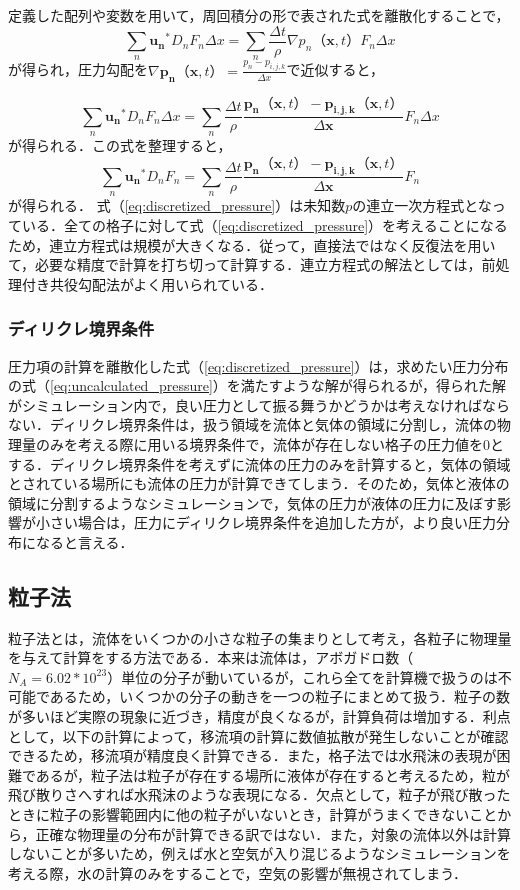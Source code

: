 \documentclass[a4j,12pt]{jreport}
\begin{document}
定義した配列や変数を用いて，周回積分の形で表された式を離散化することで，
$$ \sum_{n}\bm{u_n}^*D_nF_n\varDelta x = \sum_{n}\frac{\varDelta t}{\rho}\nabla p_n（\bm{x},t）F_n\varDelta x $$
が得られ，圧力勾配を$\nabla \bm{p_n}（\bm{x},t） = \frac{p_n - p_{i,j,k}}{\varDelta x}$で近似すると，

$$ \sum_{n}\bm{u_n}^*D_nF_n\varDelta x = \sum_{n}\frac{\varDelta t}{\rho}\frac{\bm{p_n}（\bm{x},t） - \bm{p_{i,j,k}}（\bm{x},t）}{\varDelta \bm{x}}F_n\varDelta x $$
が得られる．この式を整理すると，
\begin{equation}\label{eq:discretized_pressure}
\sum_{n}\bm{u_n}^*D_nF_n= \sum_{n}\frac{\varDelta t}{\rho}\frac{\bm{p_n}（\bm{x},t） - \bm{p_{i,j,k}}（\bm{x},t）}{\varDelta \bm{x}}F_n
\end{equation} 
が得られる．
式（\ref{eq:discretized_pressure}）は未知数$p$の連立一次方程式となっている．全ての格子に対して式（\ref{eq:discretized_pressure}）を考えることになるため，連立方程式は規模が大きくなる．従って，直接法ではなく反復法を用いて，必要な精度で計算を打ち切って計算する．連立方程式の解法としては，前処理付き共役勾配法がよく用いられている．

\subsubsection{ディリクレ境界条件} \label{subsec:Dirichlet}
圧力項の計算を離散化した式（\ref{eq:discretized_pressure}）は，求めたい圧力分布の式（\ref{eq:uncalculated_pressure}）を満たすような解が得られるが，得られた解がシミュレーション内で，良い圧力として振る舞うかどうかは考えなければならない．ディリクレ境界条件は，扱う領域を流体と気体の領域に分割し，流体の物理量のみを考える際に用いる境界条件で，流体が存在しない格子の圧力値を$0$とする．ディリクレ境界条件を考えずに流体の圧力のみを計算すると，気体の領域とされている場所にも流体の圧力が計算できてしまう．そのため，気体と液体の領域に分割するようなシミュレーションで，気体の圧力が液体の圧力に及ぼす影響が小さい場合は，圧力にディリクレ境界条件を追加した方が，より良い圧力分布になると言える．

\subsection{粒子法} \label{subsec:particle}
粒子法とは，流体をいくつかの小さな粒子の集まりとして考え，各粒子に物理量を与えて計算をする方法である．本来は流体は，アボガドロ数（$N_A = 6.02*10^{23}$）単位の分子が動いているが，これら全てを計算機で扱うのは不可能であるため，いくつかの分子の動きを一つの粒子にまとめて扱う．粒子の数が多いほど実際の現象に近づき，精度が良くなるが，計算負荷は増加する．利点として，以下の計算によって，移流項の計算に数値拡散が発生しないことが確認できるため，移流項が精度良く計算できる．また，格子法では水飛沫の表現が困難であるが，粒子法は粒子が存在する場所に液体が存在すると考えるため，粒が飛び散りさへすれば水飛沫のような表現になる．欠点として，粒子が飛び散ったときに粒子の影響範囲内に他の粒子がいないとき，計算がうまくできないことから，正確な物理量の分布が計算できる訳ではない．また，対象の流体以外は計算しないことが多いため，例えば水と空気が入り混じるようなシミュレーションを考える際，水の計算のみをすることで，空気の影響が無視されてしまう．
\end{document}
